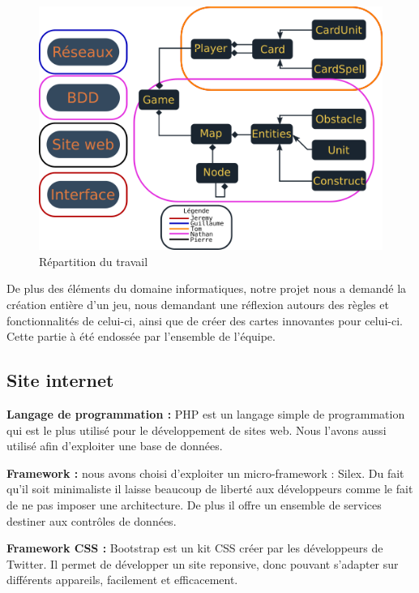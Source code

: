 \documentclass[a4paper, titlepage]{livret}
\begin{document}
    \begin{figure}[th]
      \begin{center}
        \includegraphics[scale=0.365]{Assets/UMLRepartition.png}
        \caption{Répartition du travail}
        \label{RepTravail}
      \end{center}
    \end{figure}
    
    De plus des éléments du domaine informatiques, notre projet nous a demandé la création entière d'un jeu, nous demandant une réflexion autours des règles et fonctionnalités de celui-ci, ainsi que de créer des cartes innovantes pour celui-ci. Cette partie à été endossée par l'ensemble de l'équipe.
    
    	\subsection{Site internet}

 	\textbf{Langage de programmation :} PHP est un langage simple de programmation qui est le plus utilisé pour le développement de sites web. Nous l'avons aussi utilisé afin d'exploiter une base de données.

	\textbf{Framework :} nous avons choisi d'exploiter un micro-framework : Silex. Du fait qu'il soit minimaliste il laisse beaucoup de liberté aux développeurs comme le fait de ne pas imposer une architecture. De plus il offre un ensemble de services destiner aux contrôles de données.

	\textbf{Framework CSS :} Bootstrap est un kit CSS créer par les développeurs de Twitter. Il permet de développer un site reponsive, donc pouvant s'adapter sur différents appareils, facilement et efficacement.
\end{document}
